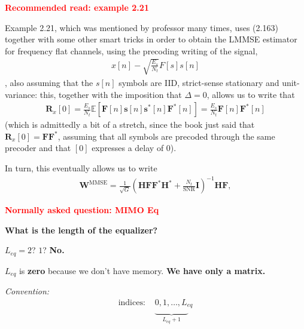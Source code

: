 \documentclass[a4paper, 12pt]{book}
\begin{document}
\begin{tcolorbox}[colback=red!5, colframe=red, boxrule=0.5pt, sharp corners]
    \textbf{\textcolor{red}{ Recommended read: example 2.21}}
    \vspace{0.5em}
    
    Example 2.21, which was mentioned by professor many times, uses (2.163) together with some other smart tricks in order to obtain the LMMSE estimator for frequency flat channels, using the precoding writing of the signal,
    \begin{align}
        x[n] - \sqrt{\frac{E_s}{N_t}} F[s] s[n] \label{eq:2.166}
    \end{align}
    , also assuming that the $s[n]$ symbols are IID, strict-sense stationary and unit-variance: this, together with the imposition that $\Delta = 0$, allows us to write that
    \begin{align*}
        \mathbf{R}_x[0] = \frac{E_s}{N_t}\mathbb{E}[\mathbf{F}[n]\mathbf{s}[n]\mathbf{s}^*[n]\mathbf{F}^*[n]] = \frac{E_s}{N_t}\mathbf{F}[n]\mathbf{F}^*[n]
    \end{align*}
    (which is admittedly a bit of a stretch, since the book just said that $\mathbf{R}_x[0] = \mathbf{F}\mathbf{F}^*$, assuming that all symbols are precoded through the same precoder and that $[0]$ expresses a delay of 0).

    In turn, this eventually allows us to write
    \begin{align}
        \mathbf{W}^{\text{MMSE}} = \frac{1}{\sqrt{G}} \left( \mathbf{H}\mathbf{F}\mathbf{F}^*\mathbf{H}^* + \frac{N_t}{\text{SNR}}\mathbf{I} \right)^{-1} \mathbf{H}\mathbf{F}, \tag{2.182}
    \end{align}
\end{tcolorbox}

\begin{tcolorbox}[colback=red!5, colframe=red, boxrule=0.5pt, sharp corners]
    \textbf{\textcolor{red}{ Normally asked question: MIMO Eq}}
    \vspace{1em}
    
    \begin{minipage}[t]{0.6\textwidth}
        \textbf{What is the length of the equalizer?}
        \vspace{0.5em}
        
        $L_{eq} = 2$? $1$? \textbf{No.}
        \vspace{0.5em}
        
        $L_{eq}$ is \textbf{zero} because we don't have memory.
        \textbf{We have only a matrix.}
    \end{minipage}%
    \hfill
    \begin{minipage}[t]{0.35\textwidth}
        \centering
        \small
        \textit{Convention:}
        \begin{align*}
           \text{indices: } & \boxed{0}, 1, \dots, L_{eq} \\
           & \underbrace{\hspace{4em}}_{L_{eq} + 1}
        \end{align*}
    \end{minipage}
\end{tcolorbox}
\end{document}
